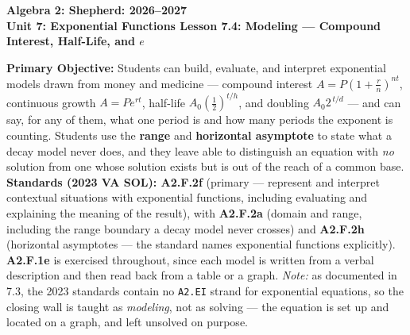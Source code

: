 \documentclass[10pt]{article}
\newcommand{\CourseName}{Algebra 2: Shepherd}
\newcommand{\SchoolYear}{2026--2027}
\newcommand{\UnitNumberName}{Unit 7: Exponential Functions \quad}
\newcommand{\LessonNumberName}{Lesson 7.4: Modeling --- Compound Interest, Half-Life, and $e$}
\begin{document}
\begin{center}
    {\Large\bfseries \CourseName: \SchoolYear \\
    {\small\bfseries \UnitNumberName \LessonNumberName}}
\end{center}

\begin{tcolorbox}[colback=forestbg, colframe=forest, boxrule=0.9pt, arc=2mm,
    left=2mm, right=2mm, top=1.5mm, bottom=1.5mm]
    \textbf{Primary Objective:} Students can build, evaluate, and interpret exponential models drawn
    from money and medicine --- compound interest $A=P\left(1+\frac{r}{n}\right)^{nt}$, continuous
    growth $A=Pe^{rt}$, half-life $A_{0}\left(\frac12\right)^{t/h}$, and doubling
    $A_{0}2^{\,t/d}$ --- and can say, for any of them, what one period is and how many periods the
    exponent is counting. Students use the \textbf{range} and \textbf{horizontal asymptote} to state
    what a decay model never does, and they leave able to distinguish an equation with \emph{no}
    solution from one whose solution exists but is out of the reach of a common base.
    \\[2pt]
    \textbf{Standards (2023 VA SOL): A2.F.2f} (primary --- represent and interpret contextual
    situations with exponential functions, including evaluating and explaining the meaning of the
    result), with \textbf{A2.F.2a} (domain and range, including the range boundary a decay model never
    crosses) and \textbf{A2.F.2h} (horizontal asymptotes --- the standard names exponential functions
    explicitly). \textbf{A2.F.1e} is exercised throughout, since each model is written from a verbal
    description and then read back from a table or a graph. \emph{Note:} as documented in 7.3, the
    2023 standards contain no \texttt{A2.EI} strand for exponential equations, so the closing wall is
    taught as \emph{modeling}, not as solving --- the equation is set up and located on a graph, and
    left unsolved on purpose.
\end{tcolorbox}
\end{document}
